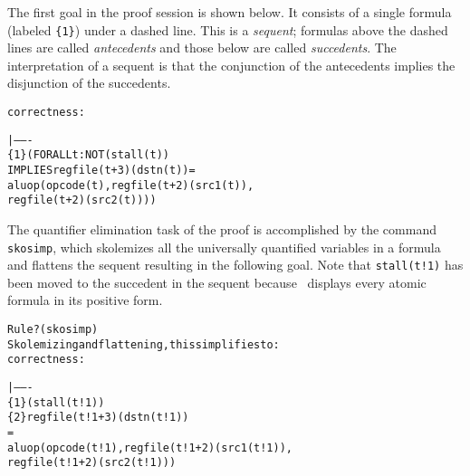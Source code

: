 The first goal in the proof session is shown below.
It consists of a
single formula (labeled {\tt \{1\}}) under a dashed line.  This is a
{\em sequent\/}; formulas above the dashed lines are called {\em
antecedents\/} and those below are called {\em succedents\/}.  The
interpretation of a sequent is that the conjunction of the antecedents
implies the disjunction of the succedents.

\mbox{}

\noindent
\begin{boxedminipage}{\textwidth}
\begin{alltt}
{\smaller\smaller
correctness :   

  |-------
\{1\}   (FORALL t: NOT (stall(t))
                  IMPLIES regfile(t + 3)(dstn(t)) =
                     aluop(opcode(t), regfile(t + 2)(src1(t)),
                           regfile(t + 2)(src2(t))))
}
\end{alltt}
\end{boxedminipage}

\mbox{}

The quantifier elimination task of the proof is accomplished
by the command {\tt skosimp}, which skolemizes all the universally quantified
variables in a formula and flattens the sequent resulting in the following
goal.  Note that {\tt stall(t!1)} has been moved to the
succedent in the sequent because \pvs\ displays every atomic formula in
its positive form.

\mbox{}

\noindent
\begin{boxedminipage}{\textwidth}
\begin{alltt}
{\smaller\smaller
Rule? (skosimp)
Skolemizing and flattening, this simplifies to: 
correctness :   

  |-------
\{1\}   (stall(t!1))
\{2\}   regfile(t!1 + 3)(dstn(t!1))
        =
        aluop(opcode(t!1), regfile(t!1 + 2)(src1(t!1)),
              regfile(t!1 + 2)(src2(t!1)))
}
\end{alltt}
\end{boxedminipage}

\mbox{}

